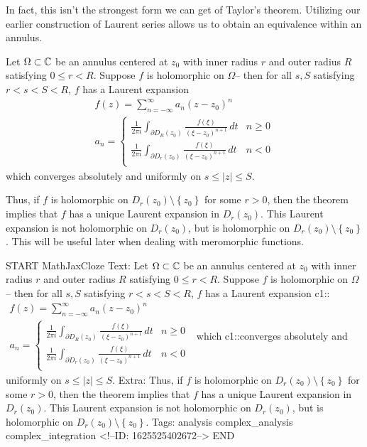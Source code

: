 \documentclass{memoir}
\begin{document}
In fact, this isn't the strongest form we can get of Taylor's theorem. Utilizing our earlier construction of Laurent series allows us to obtain an equivalence within an annulus.
\begin{thm}
	Let \(\Omega \subset \mathbb{C}\) be an annulus centered at \(z_0\) with inner radius \(r\) and outer radius \(R\) satisfying \(0\leq r<R\). Suppose \(f\) is holomorphic on \(\Omega \)-- then for all \(s,S\) satisfying \(r<s<S<R\), \(f\) has a Laurent expansion
	\begin{align*}
		f(z) = \sum_{n=-\infty}^{\infty} a_n (z-z_0)^{n}\\
		a_n = \begin{cases}
			\frac{1}{2\pi i} \int_{\partial D_R(z_0)} \frac{f(\xi )}{(\xi -z_0)^{n+1}}\,d t & n\geq 0\\
			\frac{1}{2\pi i} \int_{\partial D_r(z_0)} \frac{f(\xi )}{(\xi -z_0)^{n+1}}\,d t & n< 0\\
		\end{cases}
	\end{align*}
	which converges absolutely and uniformly on \(s\leq \left| z \right| \leq S\).
\end{thm}
Thus, if \(f\) is holomorphic on \(D_r(z_0)\setminus\left\{ z_0 \right\} \) for some \(r>0\), then the theorem implies that \(f\) has a unique Laurent expansion in \(D_r(z_0)\). This Laurent expansion is not holomorphic on \(D_r(z_0)\), but is holomorphic on \(D_r(z_0)\setminus\left\{ z_0 \right\} \). This will be useful later when dealing with meromorphic functions.

\begin{anki}
START
MathJaxCloze
Text: Let \(\Omega \subset \mathbb{C}\) be an annulus centered at \(z_0\) with inner radius \(r\) and outer radius \(R\) satisfying \(0\leq r<R\). Suppose \(f\) is holomorphic on \(\Omega \)-- then for all \(s,S\) satisfying \(r<s<S<R\), \(f\) has a Laurent expansion
 {{c1::\(\begin{align*}
         	f(z) = \sum_{n=-\infty}^{\infty} a_n (z-z_0)^{n}\\
         	a_n = \begin{cases}
         		\frac{1}{2\pi i} \int_{\partial D_R(z_0)} \frac{f(\xi )}{(\xi -z_0)^{n+1}}\,d t & n\geq 0\\
         		\frac{1}{2\pi i} \int_{\partial D_r(z_0)} \frac{f(\xi )}{(\xi -z_0)^{n+1}}\,d t & n< 0\\
         	\end{cases}
         \end{align*}\)}} 
	which {{c1::converges absolutely and uniformly}} on \(s\leq \left| z \right| \leq S\).
Extra: Thus, if \(f\) is holomorphic on \(D_r(z_0)\setminus\left\{ z_0 \right\} \) for some \(r>0\), then the theorem implies that \(f\) has a unique Laurent expansion in \(D_r(z_0)\). This Laurent expansion is not holomorphic on \(D_r(z_0)\), but is holomorphic on \(D_r(z_0)\setminus\left\{ z_0 \right\} \).
Tags: analysis complex_analysis complex_integration
<!--ID: 1625525402672-->
END
\end{anki}


\end{document}
